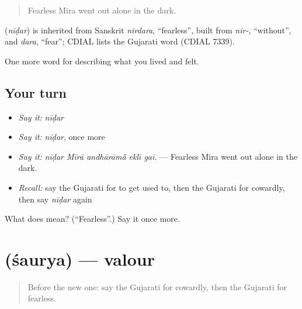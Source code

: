 \begin{quote}
Fearless Mira went out alone in the dark.
\end{quote}

\begin{cousinweb}
\textbf{} (\emph{nīḍar}) is inherited from Sanskrit \emph{nirdara}, \textquotedblleft{}fearless\textquotedblright{}, built from \emph{nir-}, \textquotedblleft{}without\textquotedblright{}, and \emph{dara}, \textquotedblleft{}fear\textquotedblright{}; CDIAL lists the Gujarati word (CDIAL 7339).
\end{cousinweb}

\begin{grammarlens}[title={What you've built}]
One more word for describing what you lived and felt.
\end{grammarlens}

\subsection*{Your turn}
\begin{itemize}
\raggedright
  \item \emph{Say it:} \emph{nīḍar}
  \item \emph{Say it:} \emph{nīḍar}, once more
  \item \emph{Say it:} \emph{nīḍar Mīrā andhārāmā̃ eklī gaī.} — Fearless Mira went out alone in the dark.
  \item \emph{Recall:} say the Gujarati for to get used to, then the Gujarati for cowardly, then say \emph{nīḍar} again
\end{itemize}

\begin{tcolorbox}[breakable,colback=teal!4,colframe=teal!35!black,title={Before you move on}]
What does  mean? (\textquotedblleft{}Fearless\textquotedblright{}.) Say it once more.
\end{tcolorbox}
\section[\texorpdfstring{\gu{શૌર્ય} (śaurya)}{શૌર્ય (śaurya)}]{ (śaurya) — valour}

\label{lesson:GU-C466-saurya}



\begin{quote}
Before the new one: say the Gujarati for cowardly, then the Gujarati for fearless.
\end{quote}

